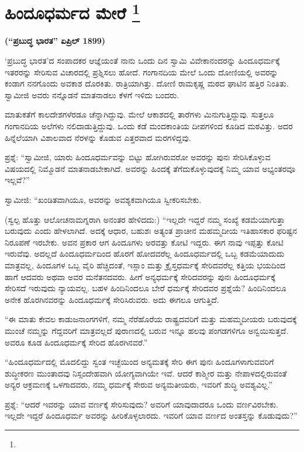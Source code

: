 
\chapter[ಹಿಂದೂಧರ್ಮದ ಮೇರೆ ]{ಹಿಂದೂಧರ್ಮದ ಮೇರೆ \protect\footnote{}}

\centerline{\textbf{(“ಪ್ರಬುದ್ಧ ಭಾರತ” ಏಪ್ರಿಲ್​ 1899)}}

‘ಪ್ರಬುದ್ಧ ಭಾರತ’ದ ಸಂಪಾದಕರ ಆಜ್ಞೆಯಂತೆ ನಾನು ಒಂದು ದಿನ ಸ್ವಾಮಿ ವಿವೇಕಾನಂದರನ್ನು ಹಿಂದೂಧರ್ಮಕ್ಕೆ ಇತರರನ್ನು ಸೇರಿಸುವ ವಿಚಾರದಲ್ಲಿ ಪ್ರಶ್ನಿಸಲು ಹೋದೆ. ಗಂಗಾನದಿಯ ಮೇಲೆ ಒಂದು ದೋಣಿಯಲ್ಲಿ ಅವರನ್ನು ಕಂಡಾಗ ನನಗೊಂದು ಅವಕಾಶ ದೊರಕಿತು. ರಾತ್ರಿಯಾಗಿತ್ತು. ದೋಣಿ ರಾಮಕೃಷ್ಣ ಮಠದ ಘಾಟಿನ ಹತ್ತಿರ ನಿಂತಿತು. ಸ್ವಾಮೀಜಿ ಅವರು ನನ್ನೊಡನೆ ಮಾತನಾಡಲು ಕೆಳಗೆ ಇಳಿದು ಬಂದರು.

ಮಾತುಕತೆಗೆ ಕಾಲದೇಶಗಳೆರಡೂ ಚೆನ್ನಾಗಿದ್ದುವು. ಮೇಲೆ ಆಕಾಶದಲ್ಲಿ ತಾರೆಗಳು ಮಿನುಗುತ್ತಿದ್ದುವು. ಸುತ್ತಲೂ ಗಂಗಾನದಿಯ ಅಲೆಗಳು ನಲಿದಾಡುತ್ತಿದ್ದುವು. ಒಂದು ಕಡೆ ಮಂದಕಾಂತಿಯ ದೀಪಗಳಿಂದ ಕೂಡಿದ ಮಠವಿತ್ತು. ಅದರ ಹಿನ್ನೆಲೆಯಾಗಿ ವಿಶಾಲವಾದ ನೆರಳನ್ನು ಕೊಡುವ ಎತ್ತರವಾದ ಮರಗಳಿದ್ದವು.

ಪ್ರಶ್ನೆ: “ಸ್ವಾಮೀಜಿ, ಯಾರು ಹಿಂದೂಧರ್ಮವನ್ನು ಬಿಟ್ಟು ಹೋಗಿರುವರೋ ಅವರನ್ನು ಪುನಃ ಸೇರಿಸಿಕೊಳ್ಳುವ ವಿಷಯದಲ್ಲಿ ನಿಮ್ಮೊಡನೆ ಮಾತನಾಡಬೇಕಾಗಿದೆ. ಅವರನ್ನು ಹಿಂದಕ್ಕೆ ತೆಗೆದುಕೊಳ್ಳುವುದಕ್ಕೆ ನಿಮ್ಮ ಯಾವ ಅಭ್ಯಂತರವೂ ಇಲ್ಲವೆ?”

ಸ್ವಾಮೀಜಿ: “ಖಂಡಿತವಾಗಿಯೂ, ಅವರನ್ನು ಅವಶ್ಯಕವಾಗಿಯೂ ಸ್ವೀಕರಿಸಬೇಕು.

(ಸ್ವಲ್ಪ ಹೊತ್ತು ಆಲೋಚನಾಮಗ್ನರಾಗಿ ಅನಂತರ ಹೇಳಿದದು:) “ಇಲ್ಲದೇ ಇದ್ದರೆ ನಮ್ಮ ಸಂಖ್ಯೆ ಕಡಮೆಯಾಗುತ್ತಾ ಬರುವುದು ಎಂದು ಹೇಳಲಾಗಿದೆ. ಅದಕ್ಕೆ ಆಧಾರ, ಬಹುಶಃ ಅತ್ಯಂತ ಪ್ರಾಚೀನ ಮಹಮ್ಮದೀಯ ಇತಿಹಾಸಕಾರ ಫರಿಷ್ಟನ ನಿರೂಪಣೆ ಇರಬೇಕು. ಅವನ ಪ್ರಕಾರ ಆಗ ಹಿಂದೂಗಳು ಅರವತ್ತು ಕೋಟಿ ಇದ್ದರು. ಈಗ ನಾವು ಇಪ್ಪತ್ತು ಕೋಟಿ ಇರುವೆವು. ಅದಲ್ಲದೆ ಹಿಂದೂಧರ್ಮದಿಂದ ಹೊರಗೆ ಹೋದವರೆಲ್ಲ ಹಿಂದೂಧರ್ಮದಲ್ಲಿ ಒಬ್ಬ ಕಡಮೆಯಾದುದು ಮಾತ್ರವಲ್ಲ, ಹಿಂದೂಗಳ ಒಬ್ಬ ವೈರಿ ಹೆಚ್ಚಿದಂತೆ, ಇಸ್ಲಾಂ ಮತ್ತು ಕ್ರೈಸ್ತಧರ್ಮಕ್ಕೆ ಸೇರಿದವರೆಲ್ಲ ಕತ್ತಿಯ ಭಯದಿಂದ ಹಾಗೆ ಆದವರು ಅಥವಾ ಅವರ ಮನೆತನದವರು. ಹೀಗೆ ಅನ್ಯಧರ್ಮಕ್ಕೆ ಸೇರಿದವರನ್ನು ಪುನಃ ಹಿಂದೂಧರ್ಮಕ್ಕೆ ಸೇರಿಸದೆ ಇರುವುದು ನ್ಯಾಯವಲ್ಲ. ಬಹಳ ಹಿಂದಿನಿಂದಲೂ ಬೇರೆ ಧರ್ಮಕ್ಕೆ ಸೇರಿದವರ ಪ್ರಶ್ನೆಯೆ? ಹಿಂದಿನಿಂದಲೂ ಅನೇಕ ಹೊರಗಿನವರನ್ನು ಹಿಂದೂಧರ್ಮಕ್ಕೆ ಸೇರಿಸಿರುವರು. ಅದು ಈಗಲೂ ಆಗುತ್ತಿದೆ.

“ಈ ಮಾತು ಕೇವಲ ಕಾಡುಜನಾಂಗಗಳಿಗೆ, ನಮ್ಮ ನೆರೆಹೊರೆಯ ರಾಷ್ಟ್ರದವರಿಗೆ ಮತ್ತು ಮಹಮ್ಮದೀಯರು ಬರುವುದಕ್ಕೆ ಮುಂಚೆ ನಮ್ಮನ್ನು ಗೆದ್ದವರಿಗೆ ಮಾತ್ರವಲ್ಲದೆ ಪುರಾಣದಲ್ಲಿ ಬರುವ ಇನ್ನೂ ಹಲವು ಪಂಗಡಗಳಿಗೂ ಅನ್ವಯಿಸುತ್ತದೆ. ಅವರೂ ಕೂಡ ಹಿಂದೂಧರ್ಮಕ್ಕೆ ಸೇರಿದ ಹೊರಗಿನವರೆ.”

“ಹಿಂದೂಧರ್ಮದಲ್ಲಿ ಮೊದಲಿದ್ದು ಸ್ವಂತ ಇಚ್ಛೆಯಿಂದ ಅನ್ಯಮತಕ್ಕೆ ಸೇರಿ ಈಗ ಪುನಃ ಹಿಂದೂಗಳಾಗುವವರಿಗೆ ಶುದ್ಧೀಕರಣ ಮುಂತಾದವು ನಿಸ್ಸಂದೇಹವಾಗಿ ಯೋಗ್ಯವಾಗಿಯೇ ಇವೆ. ಆದರೆ ಕಾಶ್ಮೀರ ಮತ್ತು ನೇಪಾಳದಲ್ಲಿರುವಂತೆ ಅನ್ಯರ ಆಕ್ರಮಣಕ್ಕೆ ಒಳಗಾದವರು, ನಮ್ಮ ಧರ್ಮಕ್ಕೆ ಸೇರುವ ಅನ್ಯಮತೀಯರು, ಇವರಿಗೆ ಶುದ್ಧಿ ಅವಶ್ಯವಿಲ್ಲ.”

ಪ್ರಶ್ನೆ: “ಆದರೆ ಇವರನ್ನು ಯಾವ ವರ್ಣಕ್ಕೆ ಸೇರಿಸುವುದು? ಅವರಿಗೆ ಯಾವುದಾದರೂ ಒಂದು ವರ್ಣವಿರಬೇಕು. ಇಲ್ಲದೇ ಇದ್ದರೆ ಹಿಂದೂಧರ್ಮ ಅವರನ್ನು ಹೀರಿಕೊಳ್ಳಲಾರದು. ಇವರಿಗೆ ಯಾವ ವರ್ಣದ ಅಂತಸ್ತನ್ನು ಕೊಡುವುದು?”

